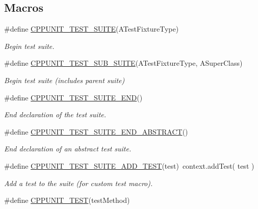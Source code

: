 \subsection*{Macros}
\begin{DoxyCompactItemize}
\item 
\#define \hyperlink{group___writing_test_fixture_gabe1e12200f40d6f25d60c1783c99da81}{C\+P\+P\+U\+N\+I\+T\+\_\+\+T\+E\+S\+T\+\_\+\+S\+U\+I\+T\+E}(A\+Test\+Fixture\+Type)
\begin{DoxyCompactList}\small\item\em Begin test suite. \end{DoxyCompactList}\item 
\#define \hyperlink{group___writing_test_fixture_gae19f30ade82172cf6c3ff297367a10c2}{C\+P\+P\+U\+N\+I\+T\+\_\+\+T\+E\+S\+T\+\_\+\+S\+U\+B\+\_\+\+S\+U\+I\+T\+E}(A\+Test\+Fixture\+Type, A\+Super\+Class)
\begin{DoxyCompactList}\small\item\em Begin test suite (includes parent suite) \end{DoxyCompactList}\item 
\#define \hyperlink{group___writing_test_fixture_ga601b2e1d525f3947b216e28c625abcb1}{C\+P\+P\+U\+N\+I\+T\+\_\+\+T\+E\+S\+T\+\_\+\+S\+U\+I\+T\+E\+\_\+\+E\+N\+D}()
\begin{DoxyCompactList}\small\item\em End declaration of the test suite. \end{DoxyCompactList}\item 
\#define \hyperlink{group___writing_test_fixture_gadcb50ede05c9da831bd8b0140fb59094}{C\+P\+P\+U\+N\+I\+T\+\_\+\+T\+E\+S\+T\+\_\+\+S\+U\+I\+T\+E\+\_\+\+E\+N\+D\+\_\+\+A\+B\+S\+T\+R\+A\+C\+T}()
\begin{DoxyCompactList}\small\item\em End declaration of an abstract test suite. \end{DoxyCompactList}\item 
\#define \hyperlink{group___writing_test_fixture_gaace55a4a3a4f3e0cd219d38e98d4f48f}{C\+P\+P\+U\+N\+I\+T\+\_\+\+T\+E\+S\+T\+\_\+\+S\+U\+I\+T\+E\+\_\+\+A\+D\+D\+\_\+\+T\+E\+S\+T}(test)~context.\+add\+Test( test )
\begin{DoxyCompactList}\small\item\em Add a test to the suite (for custom test macro). \end{DoxyCompactList}\item 
\#define \hyperlink{group___writing_test_fixture_gaac9b03d898b207e1daf2f93867935a96}{C\+P\+P\+U\+N\+I\+T\+\_\+\+T\+E\+S\+T}(test\+Method)

\end{DoxyCompactItemize}
